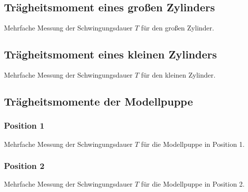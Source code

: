 \subsection{Trägheitsmoment eines großen Zylinders}
\begin{table}
    \centering
    \caption{Mehrfache Messung der Schwingungsdauer $T$ für den großen Zylinder.}
    \label{tab:zylinder_gr}  
\end{table}
\FloatBarrier

\subsection{Trägheitsmoment eines kleinen Zylinders}
\begin{table}
    \centering
    \caption{Mehrfache Messung der Schwingungsdauer $T$ für den kleinen Zylinder.}
    \label{tab:zylinder_kl}  
\end{table}
\FloatBarrier

\subsection{Trägheitsmomente der Modellpuppe}
\subsubsection{Position 1}
\begin{table}
    \centering
    \caption{Mehrfache Messung der Schwingungsdauer $T$ für die Modellpuppe in Position 1.}
    \label{tab:modellpuppe1}  
\end{table}
\FloatBarrier

\subsubsection{Position 2}
\begin{table}
    \centering
    \caption{Mehrfache Messung der Schwingungsdauer $T$ für die Modellpuppe in Position 2.}
    \label{tab:modellpuppe2}  
\end{table}
\FloatBarrier